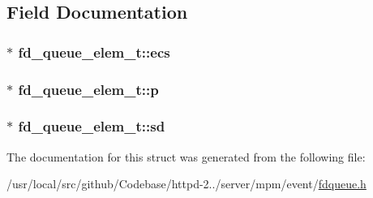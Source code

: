 \subsection{Field Documentation}
\subsubsection[{\texorpdfstring{ecs}{ecs}}]{$\ast$ fd\+\_\+queue\+\_\+elem\+\_\+t\+::ecs}\hypertarget{structfd__queue__elem__t_a4450cbada67982a9d2202b8330458a99}{}\label{structfd__queue__elem__t_a4450cbada67982a9d2202b8330458a99}
\subsubsection[{\texorpdfstring{p}{p}}]{ $\ast$ fd\+\_\+queue\+\_\+elem\+\_\+t\+::p}\hypertarget{structfd__queue__elem__t_a6b6e73a58c344f80a3fab25eb35f9fd3}{}\label{structfd__queue__elem__t_a6b6e73a58c344f80a3fab25eb35f9fd3}
\subsubsection[{\texorpdfstring{sd}{sd}}]{ $\ast$ fd\+\_\+queue\+\_\+elem\+\_\+t\+::sd}\hypertarget{structfd__queue__elem__t_a04934612aa0f85b323659d652bc061a5}{}\label{structfd__queue__elem__t_a04934612aa0f85b323659d652bc061a5}


The documentation for this struct was generated from the following file\+:\begin{DoxyCompactItemize}
\item 
/usr/local/src/github/\+Codebase/httpd-\/2../server/mpm/event/\hyperlink{event_2fdqueue_8h}{fdqueue.\+h}\end{DoxyCompactItemize}
